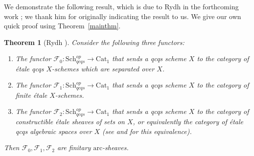 \documentclass[reqno]{amsart}
\newcommand{\sF}{\mathcal{F}}
\newcommand{\arc}{\mathrm{arc}}
\newtheorem{theorem}{Theorem}[section]
\theoremstyle{definition}
\begin{document}
We demonstrate the following result, which is due to
Rydh in the forthcoming work \cite{RydhII}; we thank him for
originally indicating the
result to us.  We give our own quick proof using 
Theorem~\ref{mainthm}. 

\newcommand{\cat}{\mathrm{Cat}}

\begin{theorem}[Rydh \cite{RydhII}] 
\label{rydhthmsheaves}
Consider the following three functors: 
\begin{enumerate}
\item  
The functor 
$\sF_0\colon  \mathrm{Sch}_{qcqs}^{op} \to \cat_1$ that sends a qcqs scheme $X$ to the category of
\'etale
qcqs $X$-schemes which are separated over $X$. 
\item 
The functor 
$\sF_1\colon  \mathrm{Sch}_{qcqs}^{op} \to \cat_1$ that sends a qcqs scheme $X$ to the category of
finite \'etale
$X$-schemes. 
\item The functor $\sF_2\colon  \mathrm{Sch}_{qcqs}^{op} \to \cat_1$ that sends a 
qcqs scheme $X$ to the category of constructible \'etale sheaves of sets on
$X$, or equivalently  the category of \'etale qcqs algebraic spaces over
$X$ (see \cite[Ch.~V, Th.~1.5]{Mil80} and \cite[Exp.~IX,
Cor.~2.7.1]{SGA4} for this equivalence).
\end{enumerate}
Then $\sF_0, \sF_1, \sF_2$  are  finitary $\arc$-sheaves. 
\end{theorem} 
\end{document}
